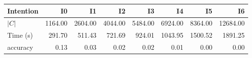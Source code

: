 \begin{tabular}{lrrrrrrr}
\toprule
Intention & I0 & I1 & I2 & I3 & I4 & I5 & I6 \\
\midrule
$|C|$ & 1164.00 & 2604.00 & 4044.00 & 5484.00 & 6924.00 & 8364.00 & 12684.00 \\
Time (s) & 291.70 & 511.43 & 721.69 & 924.01 & 1043.95 & 1500.52 & 1891.25 \\
accuracy & 0.13 & 0.03 & 0.02 & 0.02 & 0.01 & 0.00 & 0.00 \\
\bottomrule
\end{tabular}
